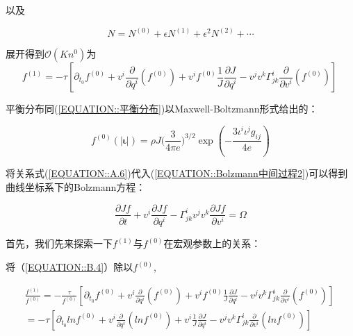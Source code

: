 \documentclass[LBMDerivation.tex]{subfiles}
\begin{document}
以及

$$
  N=N^{(0)}+\epsilon N^{(1)}+\epsilon^{2} N^{(2)}+\cdots
$$
%

展开得到$\mathcal{O}\left(K n^{0}\right)$为
\begin{equation}
  f^{(1)}=-\tau\left[\partial_{t_{0}} f^{(0)}+v^{i} \frac{\partial}{\partial q^{i}}\left(f^{(0)}\right) + v^if^{(0)} \frac{1}{J} \frac{\partial J}{\partial q^i} -v^{j} v^{k}\Gamma_{j k}^{i}\frac{\partial}{\partial v^{i}}\left(  f^{(0)}\right)\right]
  \label{EQUATION::B.4} ~
\end{equation}
%



平衡分布同(\ref{EQUATION::平衡分布})以Maxwell-Boltzmann形式给出的：
%
%

\begin{equation}
  \boxed{
    f^{(0)}(| \boldsymbol{\iota}|) = \rho J {(\frac{3}{4\pi e}})^{3/2}\exp({-\frac{3 {\iota^i\iota^jg_{ij}}}{4e}})
  }
\end{equation}

将关系式(\ref{EQUATION::A.6})代入(\ref{EQUATION::Bolzmann中间过程2})可以得到曲线坐标系下的Bolzmann方程：

\begin{equation}
  \boxed{
  \frac{\partial Jf}{\partial t}+v^{i} \frac{\partial Jf}{\partial q^{i}}  - \Gamma_{j k}^{i} v^{j} v^{k}  \frac{\partial Jf}{\partial  v^{i}}  =\Omega
  }
\end{equation}




首先，我们先来探索一下$f^{(1)}$与$f^{(0)}$在宏观参数上的关系：

将（\ref{EQUATION::B.4}）除以$f^{(0)}$,


\begin{equation}
  \begin{gathered}
    \frac{f^{(1)}}{f^{(0)}}=-\frac{\tau}{f^{(0)}}\left[\partial_{t_{0}} f^{(0)}+v^{i}\frac{\partial}{\partial q^{i}}\left( f^{(0)}\right)+v^i f^{(0)}\frac{1}{J} \frac{\partial J}{\partial q^i}-v^{j} v^{k} \Gamma_{j k}^{i} \frac{\partial}{\partial v^{i}}\left(  f^{(0)}\right)\right] \\
    = -\tau \left[\partial_{t_{0}} ln f^{(0)}+v^{i}\frac{\partial}{\partial q^{i}}\left( ln f^{(0)}\right)+v^i \frac{1}{J} \frac{\partial J}{\partial q^i} -v^{j} v^{k} \Gamma_{j k}^{i} \frac{\partial}{\partial v^{i}}\left(  ln f^{(0)}\right)\right]
  \end{gathered}
  \label{EQUATION::Kn的关系} ~
\end{equation}
\end{document}
